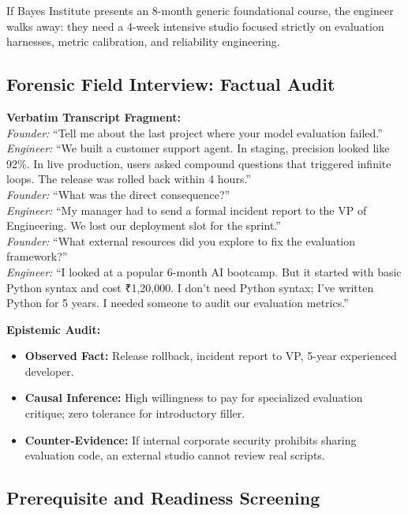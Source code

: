 If Bayes Institute presents an 8-month generic foundational course, the engineer walks away: they need a 4-week intensive studio focused strictly on evaluation harnesses, metric calibration, and reliability engineering.

\subsection{Forensic Field Interview: Factual Audit}

\noindent\textbf{Verbatim Transcript Fragment:}\\
\textit{Founder:} ``Tell me about the last project where your model evaluation failed.''\\
\textit{Engineer:} ``We built a customer support agent. In staging, precision looked like 92\%. In live production, users asked compound questions that triggered infinite loops. The release was rolled back within 4 hours.''\\
\textit{Founder:} ``What was the direct consequence?''\\
\textit{Engineer:} ``My manager had to send a formal incident report to the VP of Engineering. We lost our deployment slot for the sprint.''\\
\textit{Founder:} ``What external resources did you explore to fix the evaluation framework?''\\
\textit{Engineer:} ``I looked at a popular 6-month AI bootcamp. But it started with basic Python syntax and cost ₹1,20,000. I don't need Python syntax; I've written Python for 5 years. I needed someone to audit our evaluation metrics.''

\vspace{0.6ex}\noindent\textbf{Epistemic Audit:}
\begin{itemize}[leftmargin=1.2em,itemsep=0.2ex]
  \item \textbf{Observed Fact:} Release rollback, incident report to VP, 5-year experienced developer.
  \item \textbf{Causal Inference:} High willingness to pay for specialized evaluation critique; zero tolerance for introductory filler.
  \item \textbf{Counter-Evidence:} If internal corporate security prohibits sharing evaluation code, an external studio cannot review real scripts.
\end{itemize}

\subsection{Prerequisite and Readiness Screening}

